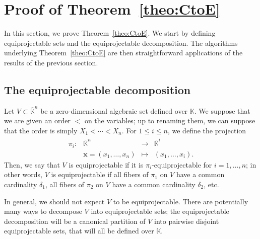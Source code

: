\documentclass[12pt]{article}
\def\K {\ensuremath{\mathbb{K}}}
\def\Kbar {\ensuremath{\overline{\mathbb{K}}}}
\def\x {\ensuremath{\mathbf{x}}}
\begin{document}
\section{Proof of Theorem~\ref{theo:CtoE}}\label{ssec:equi}

In this section, we prove Theorem~\ref{theo:CtoE}.  We start by
defining equiprojectable sets and the equiprojectable
decomposition. The algorithms underlying Theorem~\ref{theo:CtoE} are
then straightforward applications of the results of the previous
section.



\subsection{The equiprojectable decomposition}

Let $V\subset \Kbar^n$ be a zero-dimensional algebraic set defined
over $\K$. We suppose that we are given an order $<$ on the variables;
up to renaming them, we can suppose that the order is simply $X_1 <
\cdots < X_n$. For $1 \le i \le n$, we define the projection
\[
\begin{array}{lccc}
  \pi_{i}:& \Kbar^n & \to &\Kbar^i \\ & \x=(x_1,\dots,x_n) & \mapsto &
  (x_1,\dots,x_i).
\end{array}
\]
Then, we say that $V$ is equiprojectable if it is
$\pi_i$-equiprojectable for $i=1,\dots,n$; in other words, $V$ is
equiprojectable if all fibers of $\pi_1$ on $V$ have a common
cardinality $\delta_1$, all fibers of $\pi_2$ on $V$ have a common
cardinality $\delta_2$, etc.

In general, we should not expect $V$ to be equiprojectable. There are
potentially many ways to decompose $V$ into equiprojectable sets; the
equiprojectable decomposition will be a canonical partition of $V$
into pairwise disjoint equiprojectable sets, that will all be defined
over $\K$.
\end{document}
